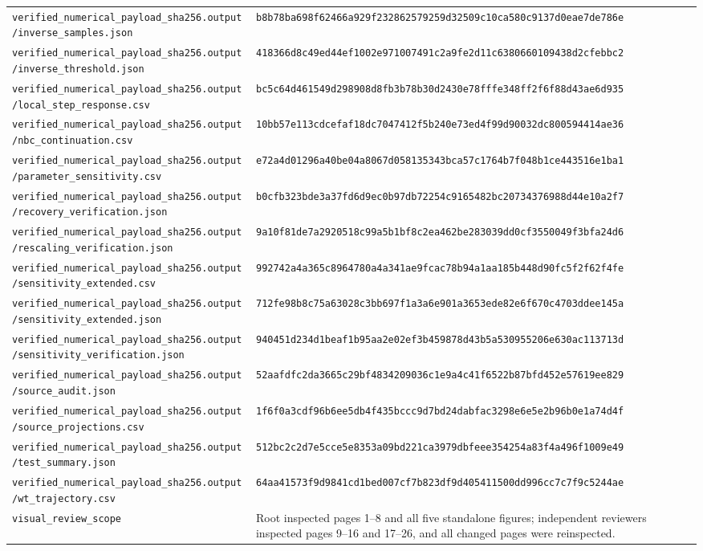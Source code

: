 \begin{longtable}{p{.46\linewidth}p{.46\linewidth}}
\nolinkurl{verified_numerical_payload_sha256.output/inverse_samples.json} & \nolinkurl{b8b78ba698f62466a929f232862579259d32509c10ca580c9137d0eae7de786e} \\
\nolinkurl{verified_numerical_payload_sha256.output/inverse_threshold.json} & \nolinkurl{418366d8c49ed44ef1002e971007491c2a9fe2d11c6380660109438d2cfebbc2} \\
\nolinkurl{verified_numerical_payload_sha256.output/local_step_response.csv} & \nolinkurl{bc5c64d461549d298908d8fb3b78b30d2430e78fffe348ff2f6f88d43ae6d935} \\
\nolinkurl{verified_numerical_payload_sha256.output/nbc_continuation.csv} & \nolinkurl{10bb57e113cdcefaf18dc7047412f5b240e73ed4f99d90032dc800594414ae36} \\
\nolinkurl{verified_numerical_payload_sha256.output/parameter_sensitivity.csv} & \nolinkurl{e72a4d01296a40be04a8067d058135343bca57c1764b7f048b1ce443516e1ba1} \\
\nolinkurl{verified_numerical_payload_sha256.output/recovery_verification.json} & \nolinkurl{b0cfb323bde3a37fd6d9ec0b97db72254c9165482bc20734376988d44e10a2f7} \\
\nolinkurl{verified_numerical_payload_sha256.output/rescaling_verification.json} & \nolinkurl{9a10f81de7a2920518c99a5b1bf8c2ea462be283039dd0cf3550049f3bfa24d6} \\
\nolinkurl{verified_numerical_payload_sha256.output/sensitivity_extended.csv} & \nolinkurl{992742a4a365c8964780a4a341ae9fcac78b94a1aa185b448d90fc5f2f62f4fe} \\
\nolinkurl{verified_numerical_payload_sha256.output/sensitivity_extended.json} & \nolinkurl{712fe98b8c75a63028c3bb697f1a3a6e901a3653ede82e6f670c4703ddee145a} \\
\nolinkurl{verified_numerical_payload_sha256.output/sensitivity_verification.json} & \nolinkurl{940451d234d1beaf1b95aa2e02ef3b459878d43b5a530955206e630ac113713d} \\
\nolinkurl{verified_numerical_payload_sha256.output/source_audit.json} & \nolinkurl{52aafdfc2da3665c29bf4834209036c1e9a4c41f6522b87bfd452e57619ee829} \\
\nolinkurl{verified_numerical_payload_sha256.output/source_projections.csv} & \nolinkurl{1f6f0a3cdf96b6ee5db4f435bccc9d7bd24dabfac3298e6e5e2b96b0e1a74d4f} \\
\nolinkurl{verified_numerical_payload_sha256.output/test_summary.json} & \nolinkurl{512bc2c2d7e5cce5e8353a09bd221ca3979dbfeee354254a83f4a496f1009e49} \\
\nolinkurl{verified_numerical_payload_sha256.output/wt_trajectory.csv} & \nolinkurl{64aa41573f9d9841cd1bed007cf7b823df9d405411500dd996cc7c7f9c5244ae} \\
\nolinkurl{visual_review_scope} & Root inspected pages 1–8 and all five standalone figures; independent reviewers inspected pages 9–16 and 17–26, and all changed pages were reinspected. \\
\end{longtable}
\endgroup


